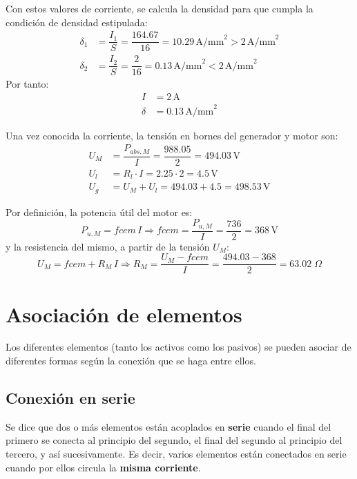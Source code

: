 \begin{example}
	    Con estos valores de corriente, se calcula la densidad para que cumpla la condición de densidad estipulada: 
	    \begin{align*}
	        \delta_1&=\dfrac{I_1}{S}=\dfrac{164.67}{16}=10.29\,\text{A/mm}^2>2\,\text{A/mm}^2\\
	        \delta_2&=\dfrac{I_2}{S}=\dfrac{2}{16}={0.13\,\text{A/mm}^2 < 2\,\text{A/mm}^2}
	    \end{align*}
	    Por tanto:
	    \begin{align*}
	        I&=2\,\text{A}\\
	        \delta&=0.13\,\text{A/mm}^2
	    \end{align*}
	    
	    Una vez conocida la corriente, la tensión en bornes del generador y motor son:
	    \begin{align*}
	        U_M&=\dfrac{P_{abs,M}}{I}=\dfrac{988.05}{2}=494.03\,\text{V}\\
	        U_l&=R_l\cdot I=2.25\cdot 2=4.5\,\text{V}\\
	        U_g&=U_M+U_l=494.03+4.5=498.53\,\text{V}
	    \end{align*}
	    
	    Por definición, la potencia útil del motor es:
	    \begin{equation*}
	        P_{u,M}=fcem\, I\Rightarrow {fcem=\dfrac{P_{u,M}}{I}=\dfrac{736}{2}=368\,\text{V}}
	    \end{equation*}
	    y la resistencia del mismo, a partir de la tensión $U_M$:
	    \begin{equation*}
	        U_M=fcem+R_M\,I\Rightarrow {R_M=\dfrac{U_M-fcem}{I}=\dfrac{494.03-368}{2}=63.02\;\Omega}
	    \end{equation*}
	    
	\end{example}
	
	\section{Asociación de elementos}
	
	Los diferentes elementos (tanto los activos como los pasivos) se pueden asociar de diferentes formas según la conexión que se haga entre ellos. 
	
	\subsection{Conexión en serie}
	Se dice que dos o más elementos están acoplados en \textbf{serie} cuando el final del primero se conecta al principio del segundo, el final del segundo al principio del tercero, y así sucesivamente. Es decir, varios elementos están conectados en serie cuando por ellos circula la \textbf{misma corriente}. 
	
